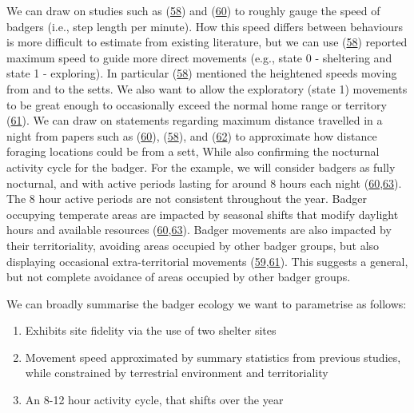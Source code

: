 \documentclass[10pt,a4paper]{article}
\begin{document}
We can draw on studies such as (\protect\hyperlink{ref-kowalczyk_daily_2006}{58}) and (\protect\hyperlink{ref-rosalino_activity_2005}{60}) to roughly gauge the speed of badgers (i.e., step length per minute).
How this speed differs between behaviours is more difficult to estimate from existing literature, but we can use (\protect\hyperlink{ref-kowalczyk_daily_2006}{58}) reported maximum speed to guide more direct movements (e.g., state 0 - sheltering and state 1 - exploring).
In particular (\protect\hyperlink{ref-kowalczyk_daily_2006}{58}) mentioned the heightened speeds moving from and to the setts.
We also want to allow the exploratory (state 1) movements to be great enough to occasionally exceed the normal home range or territory (\protect\hyperlink{ref-kelly_extra_2020}{61}).
We can draw on statements regarding maximum distance travelled in a night from papers such as (\protect\hyperlink{ref-rosalino_activity_2005}{60}), (\protect\hyperlink{ref-kowalczyk_daily_2006}{58}), and (\protect\hyperlink{ref-loureiro_path_2007}{62}) to approximate how distance foraging locations could be from a sett, While also confirming the nocturnal activity cycle for the badger.
For the example, we will consider badgers as fully nocturnal, and with active periods lasting for around 8 hours each night (\protect\hyperlink{ref-rosalino_activity_2005}{60},\protect\hyperlink{ref-magowan_dead-reckoning_2022}{63}).
The 8 hour active periods are not consistent throughout the year.
Badger occupying temperate areas are impacted by seasonal shifts that modify daylight hours and available resources (\protect\hyperlink{ref-rosalino_activity_2005}{60},\protect\hyperlink{ref-magowan_dead-reckoning_2022}{63}).
Badger movements are also impacted by their territoriality, avoiding areas occupied by other badger groups, but also displaying occasional extra-territorial movements (\protect\hyperlink{ref-feore_habitat_1999}{59},\protect\hyperlink{ref-kelly_extra_2020}{61}).
This suggests a general, but not complete avoidance of areas occupied by other badger groups.

We can broadly summarise the badger ecology we want to parametrise as follows:

\begin{enumerate}
\def\labelenumi{\arabic{enumi}.}
\item
  Exhibits site fidelity via the use of two shelter sites
\item
  Movement speed approximated by summary statistics from previous studies, while constrained by terrestrial environment and territoriality
\item
  An 8-12 hour activity cycle, that shifts over the year
\end{enumerate}
\end{document}
